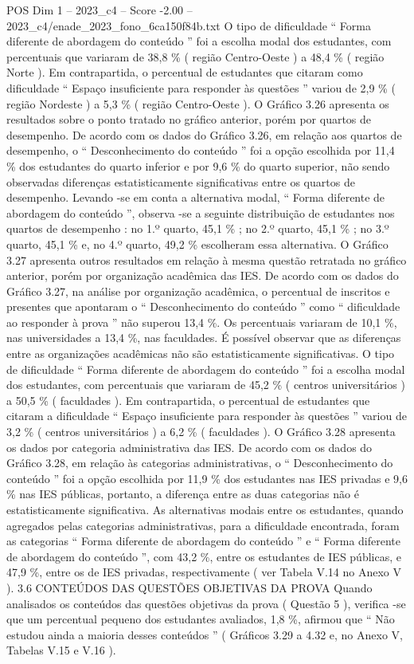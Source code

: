 \begin{textsample}{POS Dim 1 – 2023\_c4 – Score -2.00 – 2023\_c4/enade\_2023\_fono\_6ca150f84b.txt}
O tipo de dificuldade “ Forma diferente de abordagem do conteúdo ” foi a escolha modal dos estudantes, com percentuais que variaram de 38,8 \% ( região Centro-Oeste ) a 48,4 \% ( região Norte ).
Em contrapartida, o percentual de estudantes que citaram como dificuldade “ Espaço insuficiente para responder às questões ” variou de 2,9 \% ( região Nordeste ) a 5,3 \% ( região Centro-Oeste ).
O Gráfico 3.26 apresenta os resultados sobre o ponto tratado no gráfico anterior, porém por quartos de desempenho.
De acordo com os dados do Gráfico 3.26, em relação aos quartos de desempenho, o “ Desconhecimento do conteúdo ” foi a opção escolhida por 11,4 \% dos estudantes do quarto inferior e por 9,6 \% do quarto superior, não sendo observadas diferenças estatisticamente significativas entre os quartos de desempenho.
Levando -se em conta a alternativa modal, “ Forma diferente de abordagem do conteúdo ”, observa -se a seguinte distribuição de estudantes nos quartos de desempenho : no 1.º quarto, 45,1 \% ; no 2.º quarto, 45,1 \% ; no 3.º quarto, 45,1 \% e, no 4.º quarto, 49,2 \% escolheram essa alternativa.
O Gráfico 3.27 apresenta outros resultados em relação à mesma questão retratada no gráfico anterior, porém por organização acadêmica das IES.
De acordo com os dados do Gráfico 3.27, na análise por organização acadêmica, o percentual de inscritos e presentes que apontaram o “ Desconhecimento do conteúdo ” como “ dificuldade ao responder à prova ” não superou 13,4 \%.
Os percentuais variaram de 10,1 \%, nas universidades a 13,4 \%, nas faculdades.
É possível observar que as diferenças entre as organizações acadêmicas não são estatisticamente significativas.
O tipo de dificuldade “ Forma diferente de abordagem do conteúdo ” foi a escolha modal dos estudantes, com percentuais que variaram de 45,2 \% ( centros universitários ) a 50,5 \% ( faculdades ).
Em contrapartida, o percentual de estudantes que citaram a dificuldade “ Espaço insuficiente para responder às questões ” variou de 3,2 \% ( centros universitários ) a 6,2 \% ( faculdades ).
O Gráfico 3.28 apresenta os dados por categoria administrativa das IES.
De acordo com os dados do Gráfico 3.28, em relação às categorias administrativas, o “ Desconhecimento do conteúdo ” foi a opção escolhida por 11,9 \% dos estudantes nas IES privadas e 9,6 \% nas IES públicas, portanto, a diferença entre as duas categorias não é estatisticamente significativa.
As alternativas modais entre os estudantes, quando agregados pelas categorias administrativas, para a dificuldade encontrada, foram as categorias “ Forma diferente de abordagem do conteúdo ” e “ Forma diferente de abordagem do conteúdo ”, com 43,2 \%, entre os estudantes de IES públicas, e 47,9 \%, entre os de IES privadas, respectivamente ( ver Tabela V.14 no Anexo V ). 3.6 CONTEÚDOS DAS QUESTÕES OBJETIVAS DA PROVA Quando analisados os conteúdos das questões objetivas da prova ( Questão 5 ), verifica -se que um percentual pequeno dos estudantes avaliados, 1,8 \%, afirmou que “ Não estudou ainda a maioria desses conteúdos ” ( Gráficos 3.29 a 4.32 e, no Anexo V, Tabelas V.15 e V.16 ).

\end{textsample}
